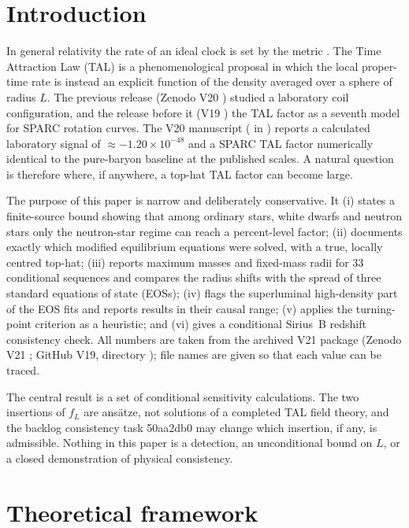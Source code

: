 \documentclass[11pt,a4paper]{article}
\newcommand{\ee}[2]{#1\times10^{#2}}
\begin{document}
\section{Introduction}
In general relativity the rate of an ideal clock is set by the metric \cite{will}. The Time Attraction Law
(TAL) \cite{tal} is a phenomenological proposal in which the local proper-time rate is instead an explicit
function of the density averaged over a sphere of radius $L$. The previous release (Zenodo V20 \cite{v20})
studied a laboratory coil configuration, and the release before it (V19 \cite{v19}) the TAL factor as a
seventh model for SPARC rotation curves. The V20 manuscript ( in \cite{gh}) reports a calculated laboratory
signal of $\approx-\ee{1.20}{-48}$ and a SPARC TAL factor numerically identical to the pure-baryon baseline
at the published scales.
A natural question is therefore where, if anywhere, a top-hat TAL factor can become large.

The purpose of this paper is narrow and deliberately conservative. It (i) states a finite-source bound
showing that among ordinary stars, white dwarfs and neutron stars only the neutron-star regime can reach a
percent-level factor; (ii) documents exactly which modified equilibrium equations were solved, with a true,
locally centred top-hat; (iii) reports maximum masses and fixed-mass radii for 33 conditional sequences and
compares the radius shifts with the spread of three standard equations of state (EOSs); (iv) flags the
superluminal high-density part of the EOS fits and reports results in their causal range; (v) applies the
turning-point criterion as a heuristic; and (vi) gives a conditional Sirius~B redshift consistency check.
All numbers are taken from the archived V21 package (Zenodo V21 \cite{v21}; GitHub V19, directory  \cite{gh});
file names are given so that each value can be traced.

The central result is a set of conditional sensitivity calculations. The two insertions of $f_L$ are
ans\"atze, not solutions of a completed TAL field theory, and the backlog consistency task 50aa2db0 may
change which insertion, if any, is admissible. Nothing in this paper is a detection, an unconditional bound
on $L$, or a closed demonstration of physical consistency.

\section{Theoretical framework}
\end{document}
